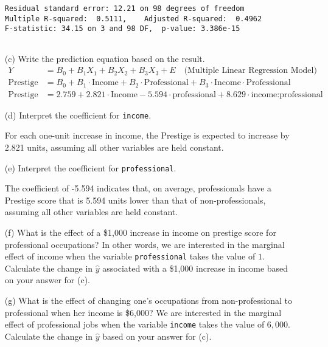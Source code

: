\documentclass[12pt,letterpaper]{article}
\begin{document}
\begin{enumerate}
\begin{verbatim}
Residual standard error: 12.21 on 98 degrees of freedom
Multiple R-squared:  0.5111,	Adjusted R-squared:  0.4962 
F-statistic: 34.15 on 3 and 98 DF,  p-value: 3.386e-15
		
	\end{verbatim}
	
	\vspace{0cm}
	\newpage
	\item [(c)]
	Write the prediction equation based on the result.
\begin{align*}
	Y &= B_0 + B_1X_1 + B_2X_2 + B_3X_3 + E \quad \text{(Multiple Linear Regression Model)} \\
	\text{Prestige} &= B_0 + B_1 \cdot \text{Income} + B_2 \cdot \text{Professional} + B_3 \cdot \text{Income} \cdot \text{Professional} \\
	\text{Prestige} &= 2.759 + 2.821 \cdot \text{Income} - 5.594 \cdot \text{professional} + 8.629 \cdot \text{income:professional}
\end{align*}

	\vspace{1cm}

	\item [(d)]
	Interpret the coefficient for \texttt{income}.

	
	 For each one-unit increase in income, the Prestige is expected to increase by 2.821 units, assuming all other variables are held constant.
	
	\vspace{1cm}	
	
	\item [(e)]
	Interpret the coefficient for \texttt{professional}.
	
	The coefficient of -5.594 indicates that, on average, professionals have a Prestige score that is 5.594 units lower than that of non-professionals, assuming all other variables are held constant.
	
	\vspace{1cm}	
	
	\item [(f)]
	What is the effect of a \$1,000 increase in income on prestige score for professional occupations? In other words, we are interested in the marginal effect of income when the variable \texttt{professional} takes the value of $1$. Calculate the change in $\hat{y}$ associated with a \$1,000 increase in income based on your answer for (c).
	
	\vspace{1cm}
	
	\newpage
	
	\item [(g)]
	What is the effect of changing one's occupations from non-professional to professional when her income is \$6,000? We are interested in the marginal effect of professional jobs when the variable \texttt{income} takes the value of $6,000$. Calculate the change in $\hat{y}$ based on your answer for (c).
	
	
	
	
\end{enumerate}
\end{document}
